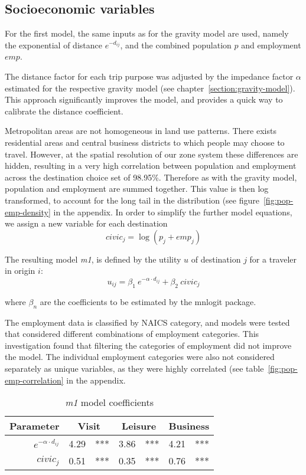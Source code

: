 \subsection{Socioeconomic variables}
For the first model, the same inputs as for the gravity model are used, namely the exponential of distance $e^{-d_{ij}}$, and the combined population $p$ and employment $emp$.

The distance factor for each trip purpose was adjusted by the impedance factor $\alpha$ estimated for the respective gravity model (see chapter~\ref{section:gravity-model}). This approach significantly improves the model, and provides a quick way to calibrate the distance coefficient.

Metropolitan areas are not homogeneous in land use patterns. There exists residential areas and central business districts to which people may choose to travel. However, at the spatial resolution of our zone system these differences are hidden, resulting in a very high correlation between population and employment across the destination choice set of 98.95\%. Therefore as with the gravity model, population and employment are summed together. This value is  then log transformed, to account for the long tail in the distribution (see figure~\ref{fig:pop-emp-density} in the appendix. In order to simplify the further model equations, we assign a new variable for each destination
$$ civic_j = \log\left( p_j + emp_j \right) $$

The resulting model \textit{m1}, is defined by the utility $u$ of destination $j$ for a traveler in origin $i$: 
$$ u_{ij} = \beta_1~e^{-\alpha \cdot d_{ij}} + \beta_2~civic_j $$

where $\beta_n$ are the coefficients to be estimated by the mnlogit package. 

The employment data is classified by NAICS category, and models were tested that considered different combinations of employment categories. This investigation found that filtering the categories of employment did not improve the model. The individual employment categories were also not considered separately as unique variables, as they were highly correlated (see table~\ref{fig:pop-emp-correlation} in the appendix.

\begin{table}[H]
\centering
\caption{\textit{m1} model coefficients}
\label{table:m1-coeff}
\begin{tabular}{@{}rrlrlrl@{}}
  \toprule
 Parameter & \multicolumn{2}{c}{Visit} & \multicolumn{2}{c}{Leisure} & \multicolumn{2}{c}{Business} \\ \midrule
  $e^{-\alpha \cdot d_{ij}}$ 	& 4.29 & *** & 3.86 & *** & 4.21 & *** \\ 
  $civic_j$ 		& 0.51 & *** & 0.35 & *** & 0.76 & *** \\   
   \bottomrule
\end{tabular}
\end{table}

